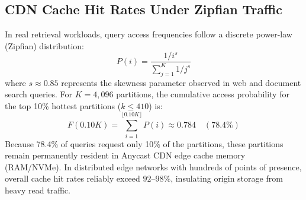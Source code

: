 \documentclass[11pt,journal,compsoc,onecolumn]{IEEEtran}
\begin{document}
\subsection{CDN Cache Hit Rates Under Zipfian Traffic}
In real retrieval workloads, query access frequencies follow a discrete power-law (Zipfian) distribution:
\begin{equation}
    P(i) = \frac{1/i^s}{\sum_{j=1}^K 1/j^s}
\end{equation}
where $s \approx 0.85$ represents the skewness parameter observed in web and document search queries. For $K = 4,096$ partitions, the cumulative access probability for the top 10\% hottest partitions ($k \le 410$) is:
\begin{equation}
    F(0.10 K) = \sum_{i=1}^{\lfloor 0.10 K \rfloor} P(i) \approx 0.784 \quad (78.4\%)
\end{equation}
Because 78.4\% of queries request only 10\% of the partitions, these partitions remain permanently resident in Anycast CDN edge cache memory (RAM/NVMe). In distributed edge networks with hundreds of points of presence, overall cache hit rates reliably exceed $92\text{--}98\%$, insulating origin storage from heavy read traffic.

\clearpage
\end{document}
